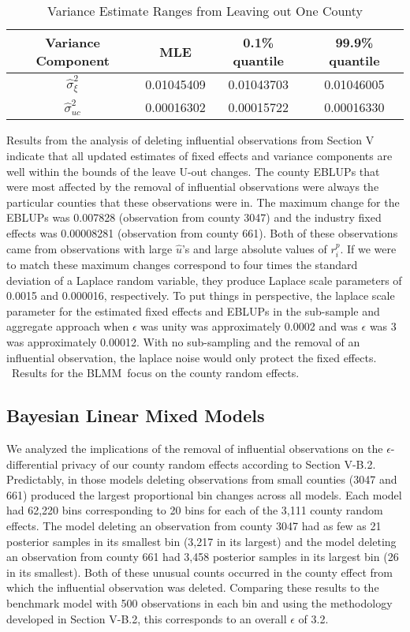 \begin{table}[h]
\begin{center}
\begin{tabular}{|c|c|c|c|}
\hline
Variance Component & MLE & 0.1\% quantile & 99.9\% quantile \\ \hline
$\hat{\sigma}_{\xi }^{2}$ & 0.01045409 & 0.01043703 & 0.01046005 \\ \hline
$\hat{\sigma}_{uc}^{2}$ & 0.00016302 & 0.00015722 & 0.00016330 \\ \hline
\end{tabular}%
\end{center}
\caption{Variance Estimate Ranges from Leaving out One County}
\label{Ta:varcomp}
\end{table}

Results from the analysis of deleting influential observations from Section
V indicate that all updated estimates of fixed effects and variance
components are well within the bounds of the leave U-out changes. The county
EBLUPs that were most affected by the removal of influential observations
were always the particular counties that these observations were in. The
maximum change for the EBLUPs was 0.007828 (observation from county 3047)
and the industry fixed effects was 0.00008281 (observation from county 661).
Both of these observations came from observations with large $\hat{u}$'s and
large absolute values of $r_{i}^{p}$. If we were to match these maximum
changes correspond to four times the standard deviation of a Laplace random
variable, they produce Laplace scale parameters of 0.0015 and 0.000016,
respectively. To put things in perspective, the laplace scale parameter for
the estimated fixed effects and EBLUPs in the sub-sample and aggregate
approach when $\epsilon $ was unity was approximately 0.0002 and was $%
\epsilon $ was 3 was approximately 0.00012. With no sub-sampling and the
removal of an influential observation, the laplace noise would only protect
the fixed effects. \ Results for the BLMM\ focus on the county random
effects.

\subsection{Bayesian Linear Mixed Models}

We analyzed the implications of the removal of influential observations on
the $\epsilon $-differential privacy of our county random effects according
to Section V-B.2. Predictably, in those models deleting observations from
small counties (3047 and 661) produced the largest proportional bin changes
across all models. Each model had 62,220 bins corresponding to 20 bins for
each of the 3,111 county random effects. The model deleting an observation
from county 3047 had as few as 21 posterior samples in its smallest bin
(3,217 in its largest) and the model deleting an observation from county 661
had 3,458 posterior samples in its largest bin (26 in its smallest). Both of
these unusual counts occurred in the county effect from which the
influential observation was deleted. Comparing these results to the
benchmark model with 500 observations in each bin and using the methodology
developed in Section V-B.2, this corresponds to an overall $\epsilon $ of
3.2.

